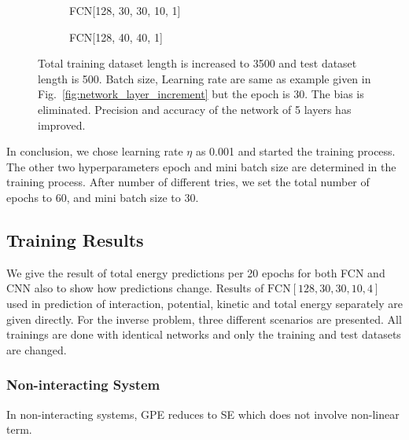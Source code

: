 \documentclass[a4paper,times,12pt]{article}
\begin{document}
\begin{figure}[H]
    \centering
    \begin{subfigure}[t]{0.45\textwidth}
		\centering
        
        \caption{FCN[128, 30, 30, 10, 1]}
		\label{fig:a}
    \end{subfigure}
    \begin{subfigure}[t]{0.45\textwidth}
        \centering
        
        \caption{FCN[128, 40, 40, 1]}
		\label{fig:b}
    \end{subfigure}
    \caption{Total training dataset length is increased to 3500 and test dataset length is 500. Batch size, Learning rate are same as example given in Fig.~\ref{fig:network_layer_increment} but the epoch is 30. The bias is eliminated. Precision and accuracy of the network of 5 layers has improved.}
\end{figure}

In conclusion, we chose learning rate $\eta$ as 0.001 and started the training process. The other two hyperparameters epoch and mini batch size are determined in the training process. After number of different tries, we set the total number of epochs to 60, and mini batch size to 30. 


\subsection{Training Results}

We give the result of total energy predictions per 20 epochs for both FCN and CNN also to show how predictions change. Results of $\mathrm{FCN}[128, 30, 30, 10, 4]$ used in prediction of interaction, potential, kinetic and total energy separately are given directly. For the inverse problem, three different scenarios are presented. All trainings are done with identical networks and only the training and test datasets are changed. 

\subsubsection{Non-interacting System}

In non-interacting systems, GPE reduces to SE which does not involve non-linear term. 
\end{document}
